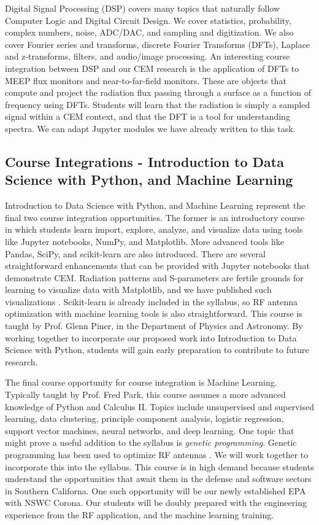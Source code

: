 \documentclass[11pt]{amsart}
\begin{document}
Digital Signal Processing (DSP) covers many topics that naturally follow Computer Logic and Digital Circuit Design.  We cover statistics, probability, complex numbers, noise, ADC/DAC, and sampling and digitization.  We also cover Fourier series and transforms, discrete Fourier Transforms (DFTs), Laplace and z-transforms, filters, and audio/image processing.  An interesting course integration between DSP and our CEM research is the application of DFTs to MEEP flux monitors and near-to-far-field monitors.  These are objects that compute and project the radiation flux passing through a surface as a function of frequency using DFTs.  Students will learn that the radiation is simply a sampled signal within a CEM context, and that the DFT is a tool for understanding spectra.  We can adapt Jupyter modules we have already written to this task. 

\subsection{Course Integrations - Introduction to Data Science with Python, and Machine Learning}

Introduction to Data Science with Python, and Machine Learning represent the final two course integration opportunities.  The former is an introductory course in which students learn import, explore, analyze, and visualize data using tools like Jupyter notebooks, NumPy, and Matplotlib.  More advanced tools like Pandas, SciPy, and scikit-learn are also introduced.  There are several straightforward enhancements that can be provided with Jupyter notebooks that demonstrate CEM.  Radiation patterns and S-parameters are fertile grounds for learning to visualize data with Matplotlib, and we have published such visualizations \cite{electronics10040415}.  Scikit-learn is already included in the syllabus, so RF antenna optimization with machine learning tools is also straightforward.  This course is taught by Prof. Glenn Piner, in the Department of Physics and Astronomy.  By working together to incorporate our proposed work into Introduction to Data Science with Python, students will gain early preparation to contribute to future research.  

The final course opportunity for course integration is Machine Learning.  Typically taught by Prof. Fred Park, this course assumes a more advanced knowledge of Python and Calculus II.  Topics include unsupervised and supervised learning, data clustering, principle component analysis, logistic regression, support vector machines, neural networks, and deep learning.  One topic that might prove a useful addition to the syllabus is \textit{genetic programming}.  Genetic programming has been used to optimize RF antennas \cite{2016MsT.........58S,genetic}.  We will work together to incorporate this into the syllabus.  This course is in high demand because students understand the opportunities that await them in the defense and software sectors in Southern Californa.  One such opportunity will be our newly established EPA with NSWC Corona.  Our students will be doubly prepared with the engineering experience from the RF application, and the machine learning training.
\end{document}
